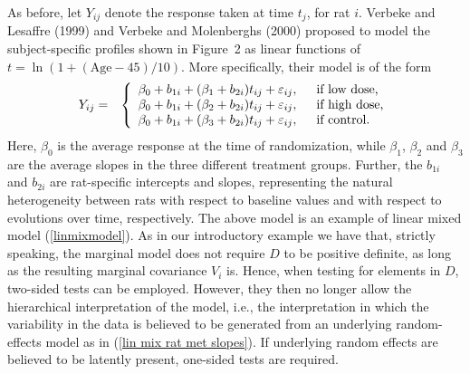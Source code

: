 \documentclass[useAMS,usenatbib,referee]{biom}
\begin{document}
As before, let $Y_{ij}$ denote the response taken at time $t_j$, for
rat $i$.  Verbeke and Lesaffre (1999) and Verbeke and Molenberghs
(2000) proposed to model the subject-specific profiles shown in
Figure~2 as linear functions of $t=\ln(1+(\mbox{Age}-45)/10)$. More
specifically, their model is of the form
\begin{eqnarray}
Y_{ij} & = & \left\{  \begin{array}{l}
              \beta_0 + b_{1i}  +  (\beta_1 + b_{2i}) t_{ij}  +  \varepsilon_{ij}, \hspace*{0.5cm} \mbox{if low dose,} \\  
              \beta_0 + b_{1i} +   (\beta_2 + b_{2i}) t_{ij}  +  \varepsilon_{ij}, \hspace*{0.5cm} \mbox{if high dose,} \\   
              \beta_0 + b_{1i} +  (\beta_3 + b_{2i}) t_{ij}   +  \varepsilon_{ij}, \hspace*{0.5cm} \mbox{if control.} 
\end{array}
\right. \label{lin mix rat met slopes}
\end{eqnarray}
Here, $\beta_0$ is the average response at the time of randomization,
while $\beta_1$, $\beta_2$ and $\beta_3$ are the average slopes in the
three different treatment groups. Further, the $b_{1i}$ and $b_{2i}$
are rat-specific intercepts and slopes, representing the natural
heterogeneity between rats with respect to baseline values and with
respect to evolutions over time, respectively. The above model is an
example of linear mixed model (\ref{linmixmodel}). As in our
introductory example we have that, strictly speaking, the marginal
model does not require $D$ to be positive definite, as long as the
resulting marginal covariance $V_i$ is. Hence, when testing for
elements in $D$, two-sided tests can be employed. However, they then
no longer allow the hierarchical interpretation of the model, i.e.,
the interpretation in which the variability in the data is believed to
be generated from an underlying random-effects model as in (\ref{lin
mix rat met slopes}). If underlying random effects are believed to be
latently present, one-sided tests are required.
\end{document}
